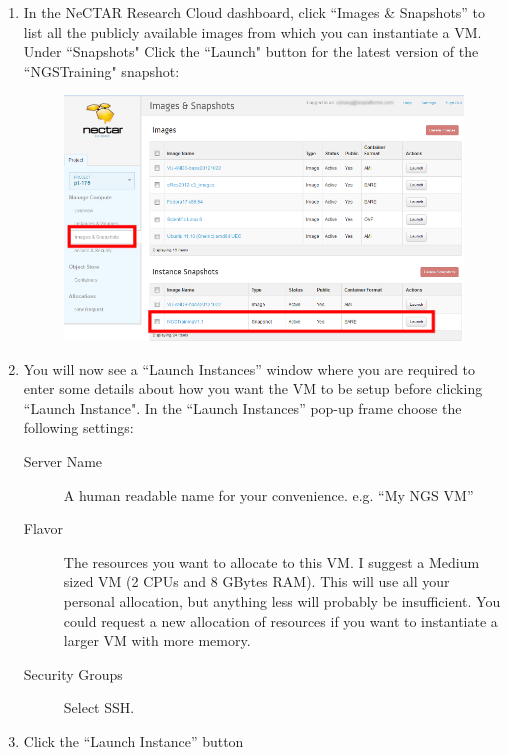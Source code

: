 \begin{enumerate}
  \item In the NeCTAR Research Cloud dashboard, click ``Images \& Snapshots''
  to list all the publicly available images from which you can instantiate a
  VM. Under ``Snapshots" Click the ``Launch" button for the latest version of the
  ``NGSTraining" snapshot:
  \begin{figure}[H]
    \centering
    \includegraphics[scale=0.5]{post-workshop/nectar/dashboard_snapshots.png}
    \caption{\label{fig:dashboard_snapshots}}
  \end{figure}
  \item You will now see a ``Launch Instances'' window where you are required to
  enter some details about how you want the VM to be setup before clicking
  ``Launch Instance".
  In the ``Launch Instances'' pop-up frame choose the following settings:
  \begin{description}
  \item[Server Name] A human readable name for your convenience. e.g. ``My NGS VM''
  \item[Flavor] The resources you want to allocate to this VM. I suggest a
  Medium sized VM (2 CPUs and 8 GBytes RAM). This will use all your personal
  allocation, but anything less will probably be insufficient. You could request
  a new allocation of resources if you want to instantiate a larger VM with more
  memory.
  \item[Security Groups] Select SSH.
  \end{description}
  \item Click the ``Launch Instance'' button
  \begin{figure}[H]
    \centering

\end{figure}
\end{enumerate}
